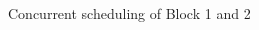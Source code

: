 \documentclass[notes xcolor=dvipsnames]{beamer}
\begin{document}
\begin{frame}{Concurrent scheduling of Block 1 and 2}
\begin{columns}
\begin{column}{0.5\textwidth}
                
                \begin{figure}
                \end{figure}

                \begin{figure}
                \end{figure}
                
            \end{column}


        \end{columns}
        
        

    \end{frame}
\end{document}
